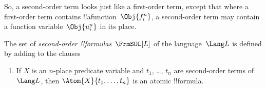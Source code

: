 \documentclass[../../../include/open-logic-section]{subfiles}
\begin{document}
\begin{explain}
So, a second-order term looks just like a first-order term, except
that where a first-order term contains !!a{function}~$\Obj{f^n_i}$, a
second-order term may contain a function variable~$\Obj{u^n_i}$ in its
place.
\end{explain}

\begin{defn}
The set of \emph{second-order !!{formula}s}~$\FrmSOL[L]$ of the
language~$\Lang L$ is defined by adding to
 the clauses
\begin{enumerate}
\item If $X$ is an $n$-place predicate variable and $t_1$, \dots,
  $t_n$ are second-order terms of~$\Lang L$, then
  $\Atom{X}{t_1,\ldots, t_n}$ is an atomic !!{formula}.




\end{enumerate}
\end{defn}
\end{document}
